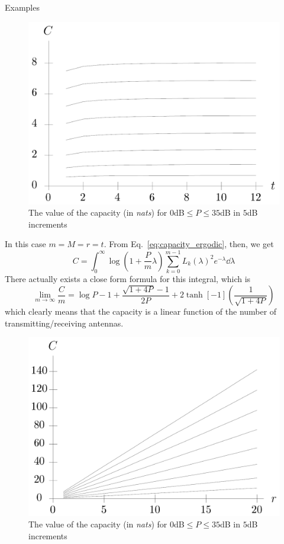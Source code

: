 \begin{frame}[allowframebreaks]{Examples}
\begin{example}[$r=1$]
	\begin{figure}
		\centering
		\includegraphics[width=0.6\linewidth]{img/capacity_r1}
		\caption{The value of the capacity (in \textit{nats}) for $0$dB$\leq P\leq 35$dB in $5$dB increments}
		\label{fig:capacity_r1}
	\end{figure}
\end{example}

\begin{example}[$r=t$]
	In this case $m=M=r=t$. From Eq.~\eqref{eq:capacity_ergodic}, then, we get
	$$C =
	\int_0^\infty \log(1+\frac{P}{m}\lambda)
	\sum_{k=0}^{m-1} L_k(\lambda)^2 e^{-\lambda}
	\dd{\lambda}$$
	There actually exists a close form formula for this integral, which is
	\begin{equation}
	\lim_{m\rightarrow\infty} \frac{C}{m} =
	\log P -1+ \frac{\sqrt{1+4P}-1}{2P} + 2\tanh[-1](\frac{1}{\sqrt{1+4P}})
	\end{equation}
	which clearly means that the capacity is a linear function of the number of transmitting/receiving antennas.
\end{example}

\begin{example}[$r=t$]
	\begin{figure}
		\centering
		\includegraphics[width=0.7\linewidth]{img/capacity_rt}
		\caption{The value of the capacity (in \textit{nats}) for $0$dB$\leq P\leq 35$dB in $5$dB increments}
		\label{fig:capacity_rt}
	\end{figure}
\end{example}

\end{frame}